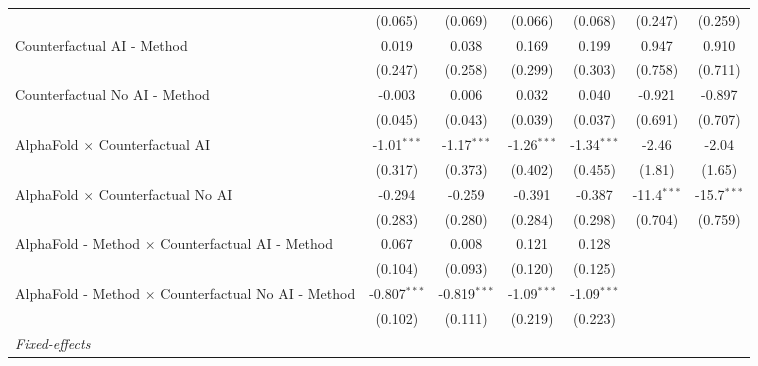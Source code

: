 \begin{tabular}{lcccccc}
                                                              & (0.065)        & (0.069)        & (0.066)       & (0.068)       & (0.247)       & (0.259)\\   
   Counterfactual AI - Method                                 & 0.019          & 0.038          & 0.169         & 0.199         & 0.947         & 0.910\\   
                                                              & (0.247)        & (0.258)        & (0.299)       & (0.303)       & (0.758)       & (0.711)\\   
   Counterfactual No AI - Method                              & -0.003         & 0.006          & 0.032         & 0.040         & -0.921        & -0.897\\   
                                                              & (0.045)        & (0.043)        & (0.039)       & (0.037)       & (0.691)       & (0.707)\\   
   AlphaFold $\times$ Counterfactual AI                       & -1.01$^{***}$  & -1.17$^{***}$  & -1.26$^{***}$ & -1.34$^{***}$ & -2.46         & -2.04\\   
                                                              & (0.317)        & (0.373)        & (0.402)       & (0.455)       & (1.81)        & (1.65)\\   
   AlphaFold $\times$ Counterfactual No AI                    & -0.294         & -0.259         & -0.391        & -0.387        & -11.4$^{***}$ & -15.7$^{***}$\\   
                                                              & (0.283)        & (0.280)        & (0.284)       & (0.298)       & (0.704)       & (0.759)\\   
   AlphaFold - Method $\times$ Counterfactual AI - Method     & 0.067          & 0.008          & 0.121         & 0.128         &               &   \\   
                                                              & (0.104)        & (0.093)        & (0.120)       & (0.125)       &               &   \\   
   AlphaFold - Method $\times$ Counterfactual No AI - Method  & -0.807$^{***}$ & -0.819$^{***}$ & -1.09$^{***}$ & -1.09$^{***}$ &               &   \\   
                                                              & (0.102)        & (0.111)        & (0.219)       & (0.223)       &               &   \\   
   \midrule
   \emph{Fixed-effects}\\

\end{tabular}
